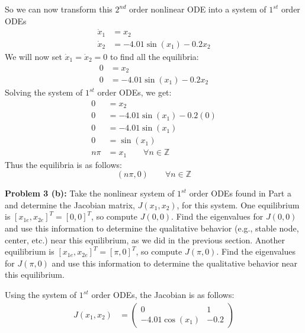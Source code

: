 \documentclass[12pt]{article}
\begin{document}
\vspace{\baselineskip}

\noindent So we can now transform this $2^{nd}$ order nonlinear ODE into a system of $1^{st}$ order ODEs
	\begin{align*}
		\dot{x}_1 &= x_2 \\
		\dot{x}_2 &= -4.01\sin(x_1) -0.2x_2
	\end{align*}
We will now set $\dot{x}_1 = \dot{x}_2 = 0$ to find all the equilibria:
	\begin{align*}
		0 &= x_2 \\
		0 &= -4.01\sin(x_1) -0.2x_2
	\end{align*}
Solving the system of $1^{st}$ order ODEs, we get:
	\begin{align*}
		0 &= x_2 \\
		0 &= -4.01\sin(x_1) -0.2(0) \\
		0 &= -4.01\sin(x_1) \\
		0 &= \sin(x_1) \\
		n\pi &= x_1 \qquad \forall n \in \mathbb{Z}
	\end{align*}
Thus the equilibria is as follows:
	$$
	(n\pi,0) \qquad \forall n \in \mathbb{Z}
	$$

\newpage

\noindent \textbf{Problem 3 (b): } Take the nonlinear system of $1^{st}$ order ODEs found in Part a and determine the Jacobian matrix, $J(x_1, x_2)$, for this system. One equilibrium is $[x_{1e}, x_{2e}]^T = [0, 0]^T$, so compute $J(0, 0)$. Find the eigenvalues for $J(0, 0)$ and use this information to determine the qualitative behavior (e.g., stable node, center, etc.) near this equilibrium, as we did in the previous section. Another equilibrium is $[x_{1e}, x_{2e}]^T = [\pi, 0]^T$, so compute $J(\pi, 0)$. Find the eigenvalues for $J(\pi, 0)$ and use this information to determine the qualitative behavior near this equilibrium.

\vspace{\baselineskip}

\noindent Using the system of $1^{st}$ order ODEs, the Jacobian is as follows:
	\begin{align*}
		J(x_1,x_2) &= 
		\begin{pmatrix}
			0 & 1 \\
			-4.01\cos(x_1) & -0.2
		\end{pmatrix}
	\end{align*}
	
\vspace{\baselineskip}
\end{document}
